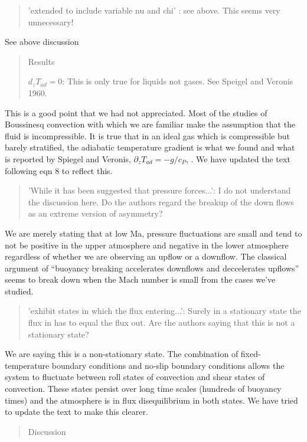 \documentclass[aps, 11pt, singlecolumn]{revtex4-1} %
\begin{document}
\begin{singlespace}
\begin{quotation}
'extended to include variable nu and chi' : see above. This seems
very unnecessary!
\end{quotation}
See above discussion

\begin{quotation}
Results

$d_z T_{ad} = 0$: This is only true for liquids not gases. See Speigel and
Veronis 1960.
\end{quotation}
This is a good point that we had not appreciated.  Most of the studies of Boussinesq
convection with which we are familiar make the assumption that the fluid is incompressible.
It is true that in an ideal gas which is compressible but barely stratified, the
adiabatic temperature gradient is what we found and what is reported by
Spiegel and Veronis, $\partial_z T_{ad} = -g/c_P$, \cite{spiegel&veronis1960}.
We have updated the text following eqn 8 to reflect this.

\begin{quotation}
'While it has been suggested that pressure forces...': I do not
understand the discussion here. Do the authors regard the breakup of
the down flows as an extreme version of asymmetry?
\end{quotation}
We are merely stating that at low Ma, pressure fluctuations are small and
tend to not be positive in the upper atmosphere and negative in the lower atmosphere
regardless of whether we are observing an upflow or a downflow.  The classical argument
\cite{hurlburt&all1984} of ``buoyancy breaking accelerates downflows and deccelerates
upflows'' seems to break down when the Mach number is small from the cases we've studied.

\begin{quotation}
'exhibit states in which the flux entering...': Surely in a
stationary state the flux in has to equal the flux out. Are the
authors saying that this is not a stationary state?
\end{quotation}
We are saying this is a non-stationary state.  The combination of fixed-temperature
boundary conditions and no-slip boundary conditions allows the system to fluctuate between
roll states of convection and shear states of convection.  These states persist over long
time scales (hundreds of buoyancy times) and the atmosphere is in flux disequilibrium in both states.
We have tried to update the text to make this clearer.

\begin{quotation}
Discussion


\end{quotation}
\end{singlespace}
\end{document}
